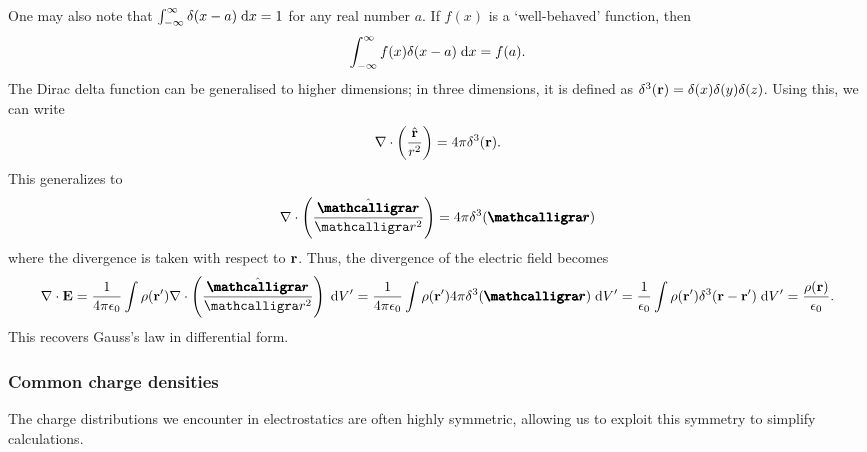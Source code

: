 One may also note that $\int_{-\infty}^{\infty} \delta(x - a) \; \mathrm{d}x = 1$ for any real number $a$. If $f(x)$ is a `well-behaved' function, then
\begin{align}
    \int_{-\infty}^{\infty} f(x) \delta(x - a) \; \mathrm{d}x = f(a).
\end{align}
The Dirac delta function can be generalised to higher dimensions; in three dimensions, it is defined as $\delta^{3}(\mathbf{r}) = \delta(x) \delta(y) \delta(z)$. Using this, we can write
\begin{align}
    \nabla \cdot \left( \frac{\hat{\mathbf{r}}}{r^{2}} \right) = 4 \pi \delta^{3}(\mathbf{r}).
\end{align}
This generalizes to
\begin{align}
    \nabla \cdot \left( \frac{\hat{\bcurs{r}}}{\curs{r}^{2}} \right) = 4 \pi \delta^{3}(\bcurs{r})
\end{align}
where the divergence is taken with respect to $\mathbf{r}$. Thus, the divergence of the electric field becomes
\begin{align}
    \nabla \cdot \bv{E} = \frac{1}{4 \pi \epsilon_{0}} \int \rho(\bv{r}') \nabla \cdot \left( \frac{\hat{\bcurs{r}}}{\curs{r}^{2}} \right) \; \di{V}' = \frac{1}{4 \pi \epsilon_{0}} \int \rho(\bv{r}') 4 \pi \delta^{3}(\bcurs{r}) \; \di{V}' = \frac{1}{\epsilon_{0}} \int \rho(\bv{r}') \delta^{3}(\bv{r} - \bv{r}') \; \di{V}' = \frac{\rho(\bv{r})}{\epsilon_{0}}.
\end{align}
This recovers Gauss's law in differential form.

\subsubsection{Common charge densities}

The charge distributions we encounter in electrostatics are often highly symmetric, allowing us to exploit this symmetry to simplify calculations. 

